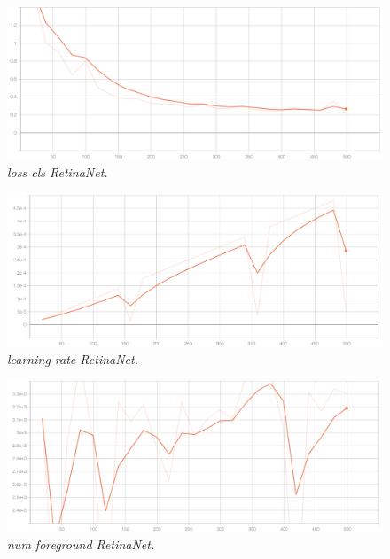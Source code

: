 \begin{figure}[h!]
\begin{center} 
\includegraphics[scale=0.35]{figures/loss_cls_retinanet_4}
\caption{\small \sl loss cls RetinaNet. \label{fig:loss_cls_retinanet}}
\end{center}
\end{figure}

\begin{figure}[h!]
\begin{center} 
\includegraphics[scale=0.35]{figures/lr_retinanet_5}
\caption{\small \sl learning rate RetinaNet. \label{fig:lr_retinanet}}
\end{center}
\end{figure}

\begin{figure}[h!]
\begin{center} 
\includegraphics[scale=0.35]{figures/num_foreground_6}
\caption{\small \sl num foreground RetinaNet. \label{fig:num_foreground}}
\end{center}
\end{figure}

